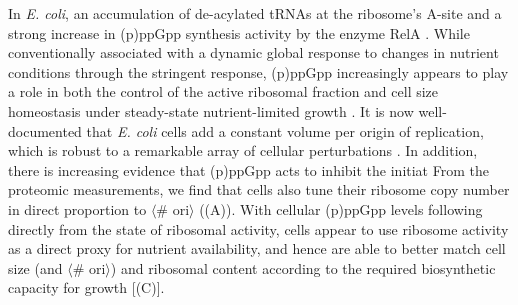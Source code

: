 In \textit{E. coli}, an accumulation of de-acylated tRNAs at the ribosome's
A-site and a strong increase in (p)ppGpp synthesis activity by the enzyme RelA
\citep{hauryliuk2015}. While conventionally associated with a dynamic global
response to changes in nutrient conditions through the stringent response,
(p)ppGpp increasingly appears to play a role in both the control of the active
ribosomal fraction and cell size homeostasis under steady-state nutrient-limited
growth \citep{dai2016, zhu2019, Buke2020, vadia2017, parker2020}. It is now
well-documented that \textit{E. coli} cells add a constant volume per origin of
replication, which is robust to a remarkable array of cellular perturbations
\citep{si2017}. In addition, there is increasing evidence that (p)ppGpp acts to
inhibit the initiat From the proteomic measurements, we find that
cells also tune their ribosome copy number in direct proportion to $\langle$\#
ori$\rangle$ ((A)). With cellular (p)ppGpp levels
following directly from the state of ribosomal activity,
cells appear to use ribosome activity as a direct proxy for nutrient
availability, and hence are able to better match cell size (and $\langle$\#
ori$\rangle$) and ribosomal content according to the required biosynthetic
capacity for growth [(C)].




%
%






